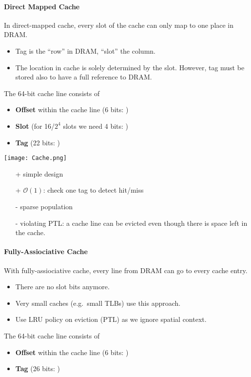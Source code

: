 \paragraph{Direct Mapped Cache}
In direct-mapped cache, every slot of the cache can only map to one place in DRAM.
\begin{itemize}
    \item Tag is the ``row'' in DRAM, ``slot'' the column.
    \item The location in cache is solely determined by the slot. However, tag must be stored also to have a full reference to DRAM.
\end{itemize}
\newpar{}
The 64-bit cache line consists of
\begin{itemize}
    \item \textbf{Offset} within the cache line (6 bits: )
    \item \textbf{Slot} (for 16/$2^4$ slots we need 4 bits: )
    \item \textbf{Tag} (22 bits: )
\end{itemize}
\texttt{[image: Cache.png]}
\newpar{}
\begin{itemize}
    \item[+] simple design
    \item[+] $\mathcal{O}(1)$: check one tag to detect hit/miss
    \item[-] sparse population
    \item[-] violating PTL: a cache line can be evicted even though there is space left in the cache.
\end{itemize}

\paragraph{Fully-Assiociative Cache}
With fully-assiociative cache, every line from DRAM can go to every cache entry. 
\begin{itemize}
    \item There are no slot bits anymore.
    \item Very small caches (e.g.\ small TLBs) use this approach.
    \item Use LRU policy on eviction (PTL) as we ignore spatial context.
\end{itemize}

\newpar{}
The 64-bit cache line consists of
\begin{itemize}
    \item \textbf{Offset} within the cache line (6 bits: )
    \item \textbf{Tag} (26 bits: )
\end{itemize}

